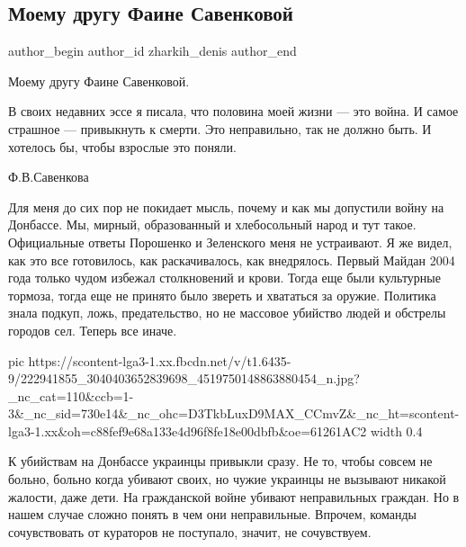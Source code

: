  
 
 
 
 
 
\subsection{Моему другу Фаине Савенковой}
\label{sec:25_07_2021.fb.zharkih_denis.1.faine_savenkovoj}
 
\ifcmt
 author_begin
   author_id zharkih_denis
 author_end
\fi

Моему другу Фаине Савенковой.

\obeycr
В своих недавних эссе я писала, что половина моей жизни — это война.
И самое страшное — привыкнуть к смерти.
Это неправильно, так не должно быть.
И хотелось бы, чтобы взрослые это поняли. 
\restorecr

Ф.В.Савенкова

Для меня до сих пор не покидает мысль, почему и как мы допустили войну на
Донбассе. Мы, мирный, образованный и хлебосольный народ и тут такое.
Официальные ответы Порошенко и Зеленского меня не устраивают. Я же видел, как
это все готовилось, как раскачивалось, как внедрялось. Первый Майдан 2004 года
только чудом избежал столкновений и крови. Тогда еще были культурные тормоза,
тогда еще не принято было звереть и хвататься за оружие. Политика знала
подкуп, ложь, предательство, но не массовое убийство людей и обстрелы городов
сел. Теперь все иначе.

\ifcmt
  pic https://scontent-lga3-1.xx.fbcdn.net/v/t1.6435-9/222941855_3040403652839698_4519750148863880454_n.jpg?_nc_cat=110&ccb=1-3&_nc_sid=730e14&_nc_ohc=D3TkbLuxD9MAX_CCmvZ&_nc_ht=scontent-lga3-1.xx&oh=c88fef9e68a133e4d96f8fe18e00dbfb&oe=61261AC2
  width 0.4
\fi

К убийствам на Донбассе украинцы привыкли сразу. Не то, чтобы совсем не больно,
больно когда убивают своих, но чужие украинцы не вызывают никакой жалости, даже
дети. На гражданской войне убивают неправильных граждан. Но в нашем случае
сложно понять в чем они неправильные. Впрочем, команды сочувствовать от
кураторов не поступало, значит, не сочувствуем. 

